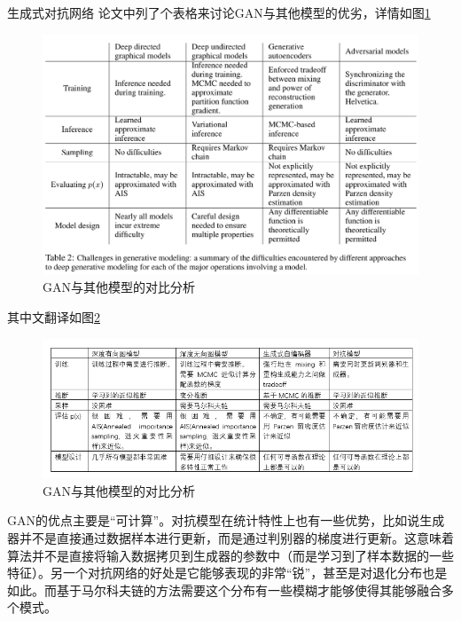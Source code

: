 \documentclass{ctexart}
\begin{document}
\begin{section}{生成式对抗网络}
		论文中列了个表格来讨论GAN与其他模型的优劣，详情如图\ref{fig:gan-comparison}
		\begin{figure}
			\centering
			\includegraphics[width=40em]{document-figures/gan-comparison.png}
			\caption{GAN与其他模型的对比分析}
			\label{fig:gan-comparison}
		\end{figure}
	
		其中文翻译如图\ref{fig:gan-comparison-ch}
		
		\begin{figure}
			\centering
			\includegraphics[width=40em]{document-figures/gan-comparison-ch.png}
			\caption{GAN与其他模型的对比分析}
			\label{fig:gan-comparison-ch}
		\end{figure}
	
		GAN的优点主要是“可计算”。对抗模型在统计特性上也有一些优势，比如说生成器并不是直接通过数据样本进行更新，而是通过判别器的梯度进行更新。这意味着算法并不是直接将输入数据拷贝到生成器的参数中（而是学习到了样本数据的一些特征）。另一个对抗网络的好处是它能够表现的非常“锐”，甚至是对退化分布也是如此。而基于马尔科夫链的方法需要这个分布有一些模糊才能够使得其能够融合多个模式。
		

\end{section}
\end{document}
